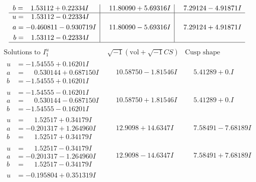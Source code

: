 \documentclass[1p]{elsarticle_modified}
\theoremstyle{definition}
\newcommand{\I}{\sqrt{-1}}
\begin{document}
$$\begin{array}{c|c|c}
\begin{aligned}
b &= \phantom{-}1.53112 + 0.22334 I\end{aligned}
 & \phantom{-}11.80090 + 5.69316 I & \phantom{-}7.29124 - 4.91871 I \\ \hline\begin{aligned}
u &= \phantom{-}1.53112 - 0.22334 I \\
a &= -0.460811 - 0.930719 I \\
b &= \phantom{-}1.53112 - 0.22334 I\end{aligned}
 & \phantom{-}11.80090 - 5.69316 I & \phantom{-}7.29124 + 4.91871 I\\
 \hline 
 \end{array}$$\newpage$$\begin{array}{c|c|c}  
\text{Solutions to }I^u_{1}& \I (\text{vol} + \sqrt{-1}CS) & \text{Cusp shape}\\
 \hline 
\begin{aligned}
u &= -1.54555 + 0.16201 I \\
a &= \phantom{-}0.530144 + 0.687150 I \\
b &= -1.54555 + 0.16201 I\end{aligned}
 & \phantom{-}10.58750 - 1.81546 I & \phantom{-}5.41289 + 0. I\phantom{ +0.000000I} \\ \hline\begin{aligned}
u &= -1.54555 - 0.16201 I \\
a &= \phantom{-}0.530144 - 0.687150 I \\
b &= -1.54555 - 0.16201 I\end{aligned}
 & \phantom{-}10.58750 + 1.81546 I & \phantom{-}5.41289 + 0. I\phantom{ +0.000000I} \\ \hline\begin{aligned}
u &= \phantom{-}1.52517 + 0.34179 I \\
a &= -0.201317 + 1.264960 I \\
b &= \phantom{-}1.52517 + 0.34179 I\end{aligned}
 & \phantom{-}12.9098 + 14.6347 I & \phantom{-}7.58491 - 7.68189 I \\ \hline\begin{aligned}
u &= \phantom{-}1.52517 - 0.34179 I \\
a &= -0.201317 - 1.264960 I \\
b &= \phantom{-}1.52517 - 0.34179 I\end{aligned}
 & \phantom{-}12.9098 - 14.6347 I & \phantom{-}7.58491 + 7.68189 I \\ \hline\begin{aligned}
u &= -0.195804 + 0.351319 I \\

\end{aligned}
\end{array}$$
\end{document}
